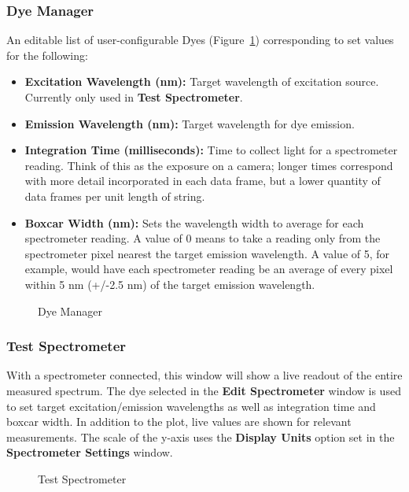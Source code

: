 \documentclass[10pt,letterpaper,titlepage]{article}
\begin{document}
    \subsubsection{Dye Manager}
    An editable list of user-configurable Dyes (Figure~\ref{fig:spectrometer_dye}) corresponding to set values for the following:
    \begin{itemize}
        \item \textbf{Excitation Wavelength (nm):} Target wavelength of excitation source. Currently only used in \textbf{Test Spectrometer}.
        \item \textbf{Emission Wavelength (nm):} Target wavelength for dye emission.
        \item \textbf{Integration Time (milliseconds):} Time to collect light for a spectrometer reading. Think of this as the exposure on a camera; longer times correspond with more detail incorporated in each data frame, but a lower quantity of data frames per unit length of string.
        \item \textbf{Boxcar Width (nm):} Sets the wavelength width to average for each spectrometer reading. A value of 0 means to take a reading only from the spectrometer pixel nearest the target emission wavelength. A value of 5, for example, would have each spectrometer reading be an average of every pixel within 5 nm (+/-2.5 nm) of the target emission wavelength. 
    \end{itemize}

    \begin{figure}[hb]
        \centering
        \caption{Dye Manager}
        \label{fig:spectrometer_dye}
    \end{figure}
    \FloatBarrier
    \newpage

    \subsubsection{Test Spectrometer}
    With a spectrometer connected, this window will show a live readout of the entire measured spectrum. The dye selected in the \textbf{Edit Spectrometer} window is used to set target excitation/emission wavelengths as well as integration time and boxcar width. In addition to the plot, live values are shown for relevant measurements. The scale of the y-axis uses the \textbf{Display Units} option set in the \textbf{Spectrometer Settings} window.

    \begin{figure}[hb]
        \centering
        \caption{Test Spectrometer}
        \label{fig:spectrometer_test}
    \end{figure}
    \FloatBarrier
    
\end{document}
